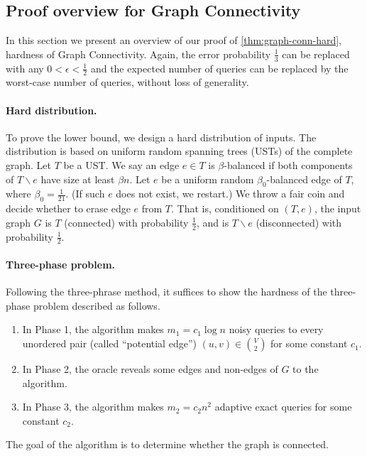 \subsection{Proof overview for Graph Connectivity} \label{sec:conn:overview}
In this section we present an overview of our proof of \cref{thm:graph-conn-hard}, hardness of Graph Connectivity. Again, the error probability $\frac 13$ can be replaced with any $0<\epsilon<\frac 12$ and the expected number of queries can be replaced by the worst-case number of queries, without loss of generality.

\paragraph{Hard distribution.}
To prove the lower bound, we design a hard distribution of inputs.
The distribution is based on uniform random spanning trees (USTs) of the complete graph.
Let $T$ be a UST. We say an edge $e\in T$ is $\beta$-balanced if both components of $T\backslash e$ have size at least $\beta n$.
Let $e$ be a uniform random $\beta_0$-balanced edge of $T$, where $\beta_0=\frac 1{21}$. (If such $e$ does not exist, we restart.)
We throw a fair coin and decide whether to erase edge $e$ from $T$.
That is, conditioned on $(T,e)$, the input graph $G$ is $T$ (connected) with probability $\frac 12$, and is $T\backslash e$ (disconnected) with probability $\frac 12$.

\paragraph{Three-phase problem.}
Following the three-phrase method, it suffices to show the hardness of the three-phase problem described as follows.
\begin{enumerate}[label=\arabic*.]
  \item \label{item:sec:conn:overview:phase-1} In Phase 1, the algorithm makes $m_1=c_1\log n$ noisy queries to every unordered pair (called ``potential edge'') $(u,v)\in \binom V2$ for some constant $c_1$.
  \item \label{item:sec:conn:overview:phase-2} In Phase 2, the oracle reveals some edges and non-edges of $G$ to the algorithm.
  \item \label{item:sec:conn:overview:phase-3} In Phase 3, the algorithm makes $m_2=c_2 n^2$ adaptive exact queries for some constant $c_2$.
\end{enumerate}
The goal of the algorithm is to determine whether the graph is connected.


